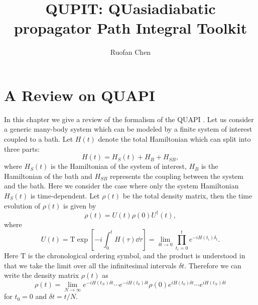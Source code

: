\documentclass[11pt]{book}
\date{}
\title{}
\begin{document}
\title{QUPIT: QUasiadiabatic propagator Path Integral Toolkit}
\author{Ruofan Chen}
\maketitle
\tableofcontents

\chapter{A Review on QUAPI}
\label{sec:orgaa65612}
In this chapter we give a review of the formalism of the QUAPI
\cite{makarov1994-path,makri1995-numerical,segal2010-numerically}.  Let
us consider a generic many-body system which can be modeled by a
finite system of interest coupled to a bath. Let \(H(t)\) denote the
total Hamiltonian which can split into three parts:
\begin{equation}
H(t)=H_S(t)+H_B+H_{SB},
\end{equation}
where \(H_S(t)\) is the Hamiltonian of the system of interest, \(H_B\) is
the Hamiltonian of the bath and \(H_{SB}\) represents the coupling
between the system and the bath. Here we consider the case where only
the system Hamiltonian \(H_S(t)\) is time-dependent. Let \(\rho(t)\) be
the total density matrix, then the time evolution of \(\rho(t)\) is
given by
\begin{equation}
\rho(t)=U(t)\rho(0)U^{\dag}(t),
\end{equation}
where
\begin{equation}
U(t)=\mathrm{T}\exp[-i\int_0^t H(\tau)\dd{\tau}]
=\lim_{\delta t\to0}\prod_{t_i=0}^t e^{-iH(t_i)\delta_t}.
\end{equation}
Here \(\mathrm{T}\) is the chronological ordering symbol, and the
product is understood in that we take the limit over all the
infinitesimal intervals \(\delta t\). Therefore we can write the density
matrix \(\rho(t)\) as
\begin{equation}
\rho(t)=\lim_{N\to\infty}e^{-iH(t_N)\delta t}\cdots e^{-iH(t_0)\delta t}
\rho(0)e^{iH(t_0)\delta t}\cdots e^{iH(t_N)\delta t}
\end{equation}
for \(t_0=0\) and \(\delta t=t/N\).
\end{document}
